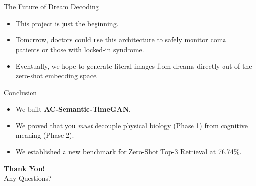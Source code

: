 \documentclass[11pt, aspectratio=169]{beamer}
\begin{document}
\begin{frame}{The Future of Dream Decoding}
    \begin{itemize}
        \item This project is just the beginning. 
        \item Tomorrow, doctors could use this architecture to safely monitor coma patients or those with locked-in syndrome.
        \item Eventually, we hope to generate literal images from dreams directly out of the zero-shot embedding space.
    \end{itemize}
\end{frame}

\begin{frame}{Conclusion}
    \begin{itemize}
        \item We built \textbf{AC-Semantic-TimeGAN}.
        \item We proved that you \textit{must} decouple physical biology (Phase 1) from cognitive meaning (Phase 2).
        \item We established a new benchmark for Zero-Shot Top-3 Retrieval at 76.74\%.
    \end{itemize}
    \vspace{1cm}
    \begin{center}
        \Large \textbf{Thank You!}\\
        \normalsize Any Questions?
    \end{center}
\end{frame}
\end{document}
